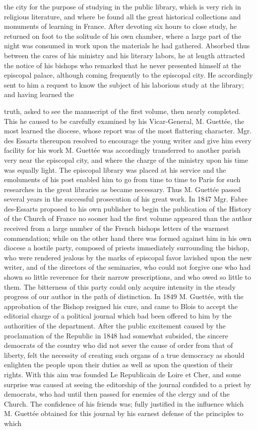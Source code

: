the city for the purpose of studying in the public library, which is very rich in religious literature, and where be found all the great historical collections and monuments of learning in France. After devoting six hours to close study, he returned on foot to the solitude of his own chamber, where a large part of the night was consumed in work upon the materials he had gathered. Absorbed thus between the cares of his ministry and his literary labors, he at length attracted the notice of his bishops who remarked that he never presented himself at the episcopal palace, although coming frequently to the episcopal city. He accordingly sent to him a request to know the subject of his laborious study at the library; and having learned the

truth, asked to see the manuscript of the first volume, then nearly completed. This he caused to be carefully examined by his Vicar-General, M. Guettée, the most learned the diocese, whose report was of the most flattering character. Mgr. des Essarts thereupon resolved to encourage the young writer and give him every facility for his work M. Guettée was accordingly transferred to another parish very near the episcopal city, and where the charge of the ministry upon his time was equally light. The episcopal library was placed at his service and the emoluments of his post enabled him to go from time to time to Paris for such researches in the great libraries as became necessary. Thus M. Guettée passed several years in the successful prosecution of his great work. In 1847 Mgr. Fabre des-Essarts proposed to his own publisher to begin the publication of the History of the Church of France no sooner had the first volume appeared than the author received from a large number of the French bishops letters of the warmest commendation; while on the other hand there was formed against him in his own diocese a hostile party, composed of priests immediately surrounding the bishop, who were rendered jealous by the marks of episcopal favor lavished upon the new writer, and of the directors of the seminaries, who could not forgive one who had shown so little reverence for their narrow prescriptions, and who owed so little to them. The bitterness of this party could only acquire intensity in the steady progress of our author in the path of distinction. In 1849 M. Guettée, with the approbation of the Bishop resigned his cure, and came to Blois to accept the editorial charge of a political journal which bad been offered to him by the authorities of the department. After the public excitement caused by the proclamation of the Republic in 1848 had somewhat subsided, the sincere democrats of the country who did not sever the cause of order from that of liberty, felt the necessity of creating such organs of a true democracy as should enlighten the people upon their duties as well as upon the question of their rights. With this aim was founded Le Republicain de Loire et Cher, and some surprise was caused at seeing the editorship of the journal confided to a priest by democrats, who had until then passed for enemies of the clergy and of the Church. The confidence of his friends was; fully justified in the influence which M. Guettée obtained for this journal by his earnest defense of the principles to which 